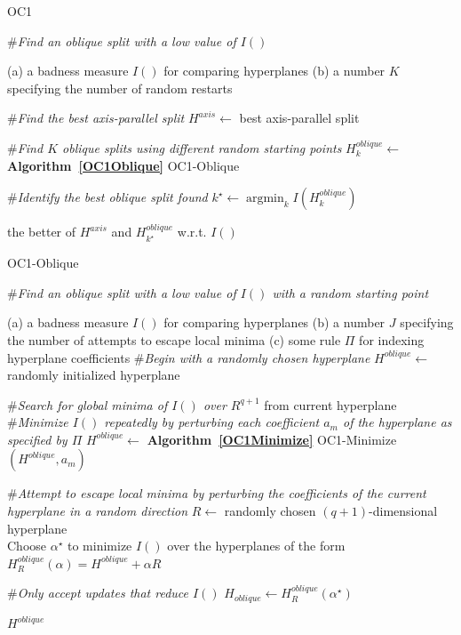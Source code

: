 \begin{algorithm}
\caption{OC1}
\begin{algorithmic}
\STATE \#\emph{Find an oblique split with a low value of $I()$}

\medskip
\REQUIRE (a) a badness measure $I()$ for comparing hyperplanes (b) a number $K$ specifying the number of random restarts

\medskip
\STATE \#\emph{Find the best axis-parallel split}
\STATE $H^{axis}\leftarrow$ best axis-parallel split

\medskip
\STATE \#\emph{Find $K$ oblique splits using different random starting points}
	\STATE $H_k^{oblique}\leftarrow$ \textbf{Algorithm~\ref{OC1Oblique}} OC1-Oblique

\ENDFOR

\medskip
\STATE \#\emph{Identify the best oblique split found}
\STATE $k^\star\leftarrow \mathop{\arg \min}_k I(H_k^{oblique})$

\medskip
\RETURN the better of $H^{axis}$ and $H_{k^\star}^{oblique}$ w.r.t. $I()$
\end{algorithmic}
\label{OC1}
\end{algorithm}

\begin{algorithm}
\caption{OC1-Oblique}
\begin{algorithmic}
\STATE \#\emph{Find an oblique split with a low value of $I()$ with a random starting point}

\medskip
\REQUIRE (a) a badness measure $I()$ for comparing hyperplanes (b) a number $J$ specifying the number of attempts to escape local minima (c) some rule $\Pi$ for indexing hyperplane coefficients
\medskip
\STATE \#\emph{Begin with a randomly chosen hyperplane}
\STATE $H^{oblique}\leftarrow$ randomly initialized hyperplane

\medskip
\STATE \#\emph{Search for global minima of $I()$ over $R^{q+1}$} from current hyperplane
\REPEAT
	\REPEAT
		\STATE \#\emph{Minimize $I()$ repeatedly by perturbing each coefficient $a_m$ of the hyperplane as specified by $\Pi$}
		\STATE $H^{oblique}\leftarrow$ \textbf{Algorithm~\ref{OC1Minimize}} OC1-Minimize$(H^{oblique},a_m)$

	\medskip
	\STATE \#\emph{Attempt to escape local minima by perturbing the coefficients of the current hyperplane in a random direction}
	\STATE $R\leftarrow$ randomly chosen $(q+1)$-dimensional hyperplane\\
	\STATE Choose $\alpha^\star$ to minimize $I()$ over the hyperplanes of the form $H_R^{oblique}(\alpha)=H^{oblique}+\alpha R$
	
	\medskip
	\STATE \#\emph{Only accept updates that reduce $I()$}
		\STATE $H_{oblique}\leftarrow H_R^{oblique}(\alpha^\star)$
	\ENDIF
{}

\medskip
\RETURN $H^{oblique}$
\end{algorithmic}
\label{OC1Oblique}
\end{algorithm}


